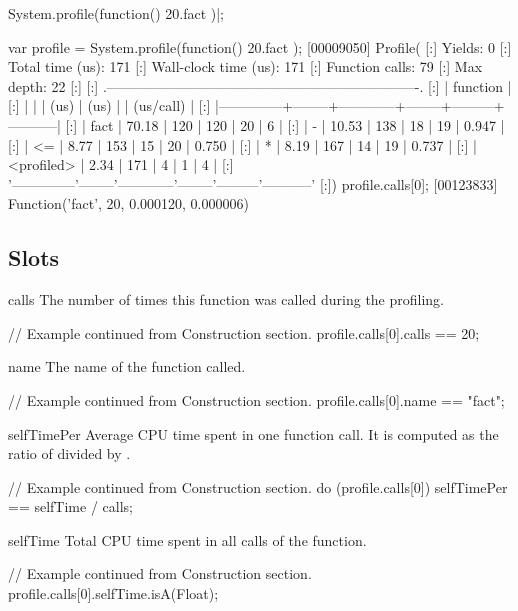 \begin{urbiscript}
System.profile(function() { 20.fact })|;

var profile = System.profile(function() { 20.fact });
[00009050] Profile(
[:]  Yields:                    0
[:]  Total time (us):         171
[:]  Wall-clock time (us):    171
[:]  Function calls:           79
[:]  Max depth:                22
[:]
[:]  .-------------------------------------------------------------------.
[:]  |   function   |   %
[:]  |              |        |    (us)    |  (us)  |         | (us/call) |
[:]  |--------------+--------+------------+--------+---------+-----------|
[:]  |         fact |  70.18 |        120 |    120 |      20 |         6 |
[:]  |            - |  10.53 |        138 |     18 |      19 |     0.947 |
[:]  |           <= |   8.77 |        153 |     15 |      20 |     0.750 |
[:]  |            * |   8.19 |        167 |     14 |      19 |     0.737 |
[:]  |   <profiled> |   2.34 |        171 |      4 |       1 |         4 |
[:]  '--------------'--------'------------'--------'---------'-----------'
[:])
profile.calls[0];
[00123833] Function('fact', 20, 0.000120, 0.000006)
\end{urbiscript}

\subsection{Slots}

\begin{urbiscriptapi}
\item[calls]%
  The number of times this function was called during the profiling.
\begin{urbiassert}
// Example continued from Construction section.
profile.calls[0].calls == 20;
\end{urbiassert}

\item[name]%
  The name of the function called.
\begin{urbiassert}
// Example continued from Construction section.
profile.calls[0].name == "fact";
\end{urbiassert}

\item[selfTimePer]%
  Average CPU time spent in one function call. It is computed as the ratio
  of  divided by .
\begin{urbiassert}
// Example continued from Construction section.
do (profile.calls[0])
{
  selfTimePer == selfTime / calls;
}
\end{urbiassert}

\item[selfTime]%
  Total CPU time spent in all calls of the function.
\begin{urbiassert}
// Example continued from Construction section.
profile.calls[0].selfTime.isA(Float);
\end{urbiassert}

\end{urbiscriptapi}


